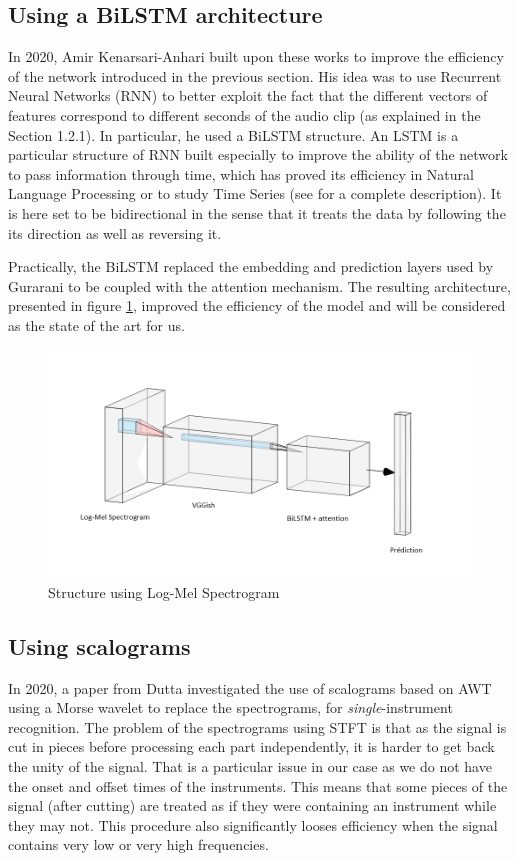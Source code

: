 \documentclass[final]{cvpr}
\begin{document}
\subsection{Using a BiLSTM architecture}
In 2020, Amir Kenarsari-Anhari \cite{squelette_progr} built upon these works to improve the efficiency of the network introduced in the previous section. His idea was to use Recurrent Neural Networks (RNN) to better exploit the fact that the different vectors of features correspond to different seconds of the audio clip (as explained in the Section 1.2.1). In particular, he used a BiLSTM structure. An LSTM is a particular structure of RNN built especially to improve the ability of the network to pass information through time, which has proved its efficiency in Natural Language Processing or to study Time Series (see \cite{lstm} for a complete description). It is here set to be bidirectional in the sense that it treats the data by following the its direction as well as reversing it.

Practically, the BiLSTM replaced the embedding and prediction layers used by Gurarani \etal to be coupled with the attention mechanism. The resulting architecture, presented in figure \ref{mel}, improved the efficiency of the model and will be considered as the state of the art for us. 
\begin{figure}
	\centering
	\includegraphics[scale = 0.45]{bilstm.png}
	\caption{Structure using Log-Mel Spectrogram}
	\label{mel}
\end{figure}
\subsection{Using scalograms}
In 2020, a paper from Dutta \etal \cite{features_descr} investigated the use of scalograms based on AWT using a Morse wavelet to replace the spectrograms, for \textit{single}-instrument recognition. The problem of the spectrograms using STFT is that as the signal is cut in pieces before processing each part independently, it is harder to get back the unity of the signal. That is a particular issue in our case as we do not have the onset and offset times of the instruments. This means that some pieces of the signal (after cutting) are treated as if they were containing an instrument while they may not. This procedure also significantly looses efficiency when the signal contains very low or very high frequencies. 
\end{document}
